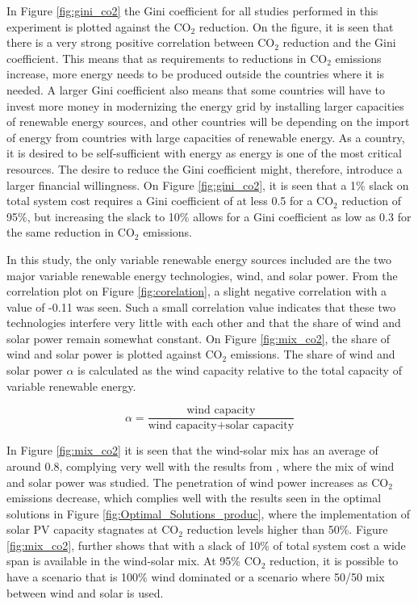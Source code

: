 In Figure \ref{fig:gini_co2} the Gini coefficient for all studies performed in this experiment is plotted against the $\text{CO}_2$ reduction. On the figure, it is seen that there is a very strong positive correlation between $\text{CO}_2$ reduction and the Gini coefficient. This means that as requirements to reductions in $\text{CO}_2$ emissions increase, more energy needs to be produced outside the countries where it is needed. A larger Gini coefficient also means that some countries will have to invest more money in modernizing the energy grid by installing larger capacities of renewable energy sources, and other countries will be depending on the import of energy from countries with large capacities of renewable energy. As a country, it is desired to be self-sufficient with energy as energy is one of the most critical resources. The desire to reduce the Gini coefficient might, therefore, introduce a larger financial willingness. On Figure \ref{fig:gini_co2}, it is seen that a 1\% slack on total system cost requires a Gini coefficient of at less 0.5 for a $\text{CO}_2$ reduction of 95\%, but increasing the slack to 10\% allows for a Gini coefficient as low as 0.3 for the same reduction in $\text{CO}_2$ emissions.  

In this study, the only variable renewable energy sources included are the two major variable renewable energy technologies, wind, and solar power. From the correlation plot on Figure \ref{fig:corelation}, a slight negative correlation with a value of -0.11 was seen. Such a small correlation value indicates that these two technologies interfere very little with each other and that the share of wind and solar power remain somewhat constant. On Figure \ref{fig:mix_co2}, the share of wind and solar power is plotted against $\text{CO}_2$ emissions. The share of wind and solar power $\alpha$ is calculated as the wind capacity relative to the total capacity of variable renewable energy. 

\begin{equation}
\alpha =  \frac{\text{wind capacity}}{\text{wind capacity}+\text{solar capacity}}
\end{equation}

In Figure \ref{fig:mix_co2} it is seen that the wind-solar mix has an average of around 0.8, complying very well with the results from \cite{rasmussen2011a}, where the mix of wind and solar power was studied. The penetration of wind power increases as $\text{CO}_2$ emissions decrease, which complies well with the results seen in the optimal solutions in Figure \ref{fig:Optimal_Solutions_produc}, where the implementation of solar PV capacity stagnates at $\text{CO}_2$ reduction levels higher than 50\%. Figure \ref{fig:mix_co2}, further shows that with a slack of 10\% of total system cost a wide span is available in the wind-solar mix. At 95\% $\text{CO}_2$ reduction, it is possible to have a scenario that is 100\% wind dominated or a scenario where 50/50 mix between wind and solar is used. 

